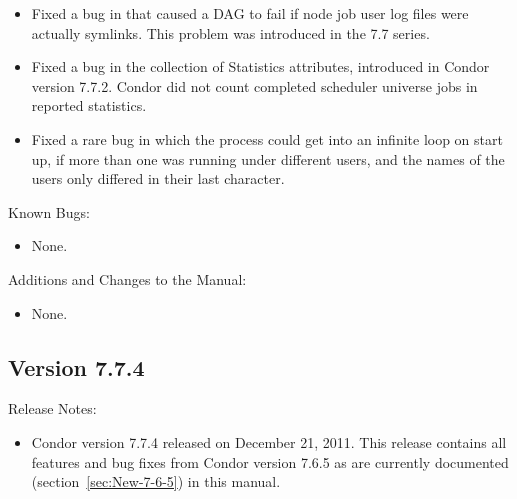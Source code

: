 \begin{itemize}
\item Fixed a bug in  that caused a DAG to fail if node
job user log files were actually symlinks.  This problem was introduced
in the 7.7 series.

\item Fixed a bug in the collection of Statistics attributes,
introduced in Condor version 7.7.2.
Condor did not count completed scheduler universe jobs in reported statistics.

\item Fixed a rare bug in which the  process could get
into an infinite loop on start up,
if more than one  was running under different users,
and the names of the users only differed in their last character.

\end{itemize}

\noindent Known Bugs:

\begin{itemize}

\item None.

\end{itemize}

\noindent Additions and Changes to the Manual:

\begin{itemize}

\item None.

\end{itemize}


\subsection*{\label{sec:New-7-7-4}Version 7.7.4}

\noindent Release Notes:

\begin{itemize}

\item Condor version 7.7.4 released on December 21, 2011.
This release contains all features and bug fixes from Condor version 7.6.5 
as are currently documented (section~\ref{sec:New-7-6-5}) in this manual. 

\end{itemize}


